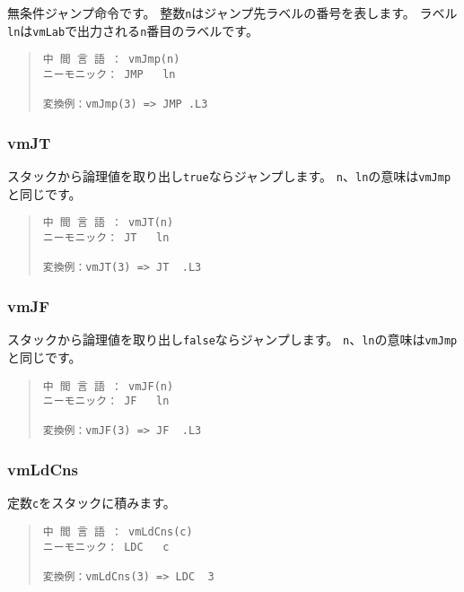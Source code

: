 無条件ジャンプ命令です。
整数\verb/n/はジャンプ先ラベルの番号を表します。
ラベル\verb/ln/は\verb/vmLab/で出力される\verb/n/番目のラベルです。

\begin{quote}
\begin{verbatim}
中 間 言 語 ： vmJmp(n)
ニーモニック： JMP   ln

変換例：vmJmp(3) => JMP .L3
\end{verbatim}
\end{quote}

\subsubsection{vmJT}

スタックから論理値を取り出し\verb/true/ならジャンプします。
\verb/n/、\verb/ln/の意味は\verb/vmJmp/と同じです。

\begin{quote}
\begin{verbatim}
中 間 言 語 ： vmJT(n)
ニーモニック： JT   ln

変換例：vmJT(3) => JT  .L3
\end{verbatim}
\end{quote}

\subsubsection{vmJF}

スタックから論理値を取り出し\verb/false/ならジャンプします。
\verb/n/、\verb/ln/の意味は\verb/vmJmp/と同じです。

\begin{quote}
\begin{verbatim}
中 間 言 語 ： vmJF(n)
ニーモニック： JF   ln

変換例：vmJF(3) => JF  .L3
\end{verbatim}
\end{quote}

\subsubsection{vmLdCns}

定数\verb/c/をスタックに積みます。

\begin{quote}
\begin{verbatim}
中 間 言 語 ： vmLdCns(c)
ニーモニック： LDC   c

変換例：vmLdCns(3) => LDC  3
\end{verbatim}
\end{quote}


